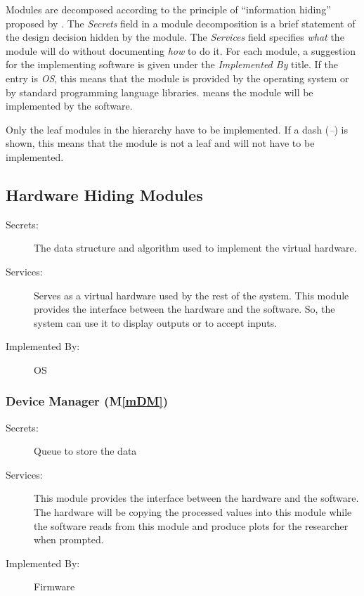\documentclass[12pt, titlepage]{article}
\newcommand{\mref}[1]{M\ref{#1}}
\begin{document}
Modules are decomposed according to the principle of ``information hiding''
proposed by \citet{ParnasEtAl1984}. The \emph{Secrets} field in a module
decomposition is a brief statement of the design decision hidden by the
module. The \emph{Services} field specifies \emph{what} the module will do
without documenting \emph{how} to do it. For each module, a suggestion for the
implementing software is given under the \emph{Implemented By} title. If the
entry is \emph{OS}, this means that the module is provided by the operating
system or by standard programming language libraries.  \emph{\progname{}} means the
module will be implemented by the \progname{} software.

Only the leaf modules in the hierarchy have to be implemented. If a dash
(\emph{--}) is shown, this means that the module is not a leaf and will not have
to be implemented.

\subsection{Hardware Hiding Modules}

\begin{description}
  \item[Secrets:]The data structure and algorithm used to implement the virtual
  hardware.
  \item[Services:]Serves as a virtual hardware used by the rest of the
  system. This module provides the interface between the hardware and the
  software. So, the system can use it to display outputs or to accept inputs.
  \item[Implemented By:] OS
\end{description}

\subsubsection{Device Manager (\mref{mDM})}
\begin{description}
  \item[Secrets:] Queue to store the data
  \item[Services:] This module provides the interface between the hardware and the
    software. The hardware will be copying the processed values into this module while the software reads from this module and produce plots for the researcher when prompted.
  \item[Implemented By:] Firmware
\end{description}
\end{document}
